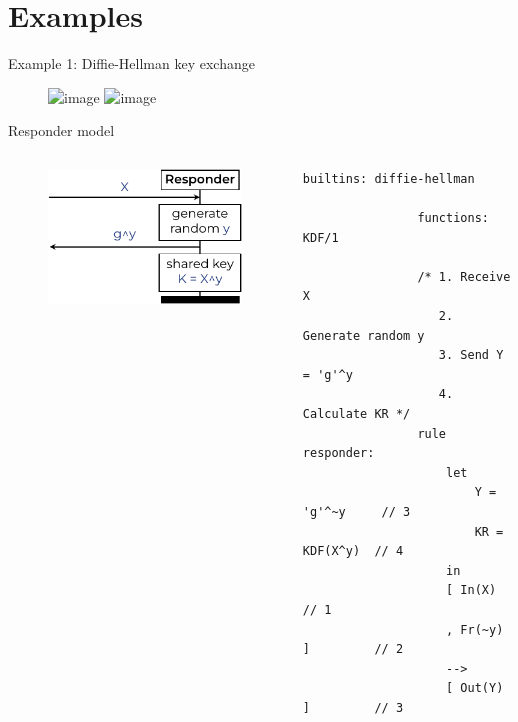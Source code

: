\documentclass[11pt,aspectratio=169]{beamer}
\begin{document}

\section*{Examples}


\begin{frame}[fragile]{Example 1: Diffie-Hellman key exchange}
    \begin{figure}
        \includegraphics<1>[width=.6\textwidth]{./figures/lecture_2/dh_1}%
        \includegraphics<2>[width=.6\textwidth]{./figures/lecture_2/dh_2}
    \end{figure}
\end{frame}

\begin{frame}[fragile]{Responder model}
    \begin{columns}
        \begin{column}{0.5\textwidth}
            \begin{figure}
                \includegraphics[width=\textwidth]{./figures/lecture_2/dh_r}
            \end{figure}
        \end{column}
        \begin{column}{0.5\textwidth}
            \begin{lstlisting}[style=tamarin, gobble=16]
                builtins: diffie-hellman

                functions: KDF/1

                /* 1. Receive X
                   2. Generate random y
                   3. Send Y = 'g'^y
                   4. Calculate KR */
                rule responder:
                    let
                        Y = 'g'^~y     // 3
                        KR = KDF(X^y)  // 4
                    in
                    [ In(X)            // 1
                    , Fr(~y) ]         // 2
                    -->
                    [ Out(Y) ]         // 3
            \end{lstlisting}
        \end{column}
    \end{columns}
    \vsep
\end{frame}
\end{document}
